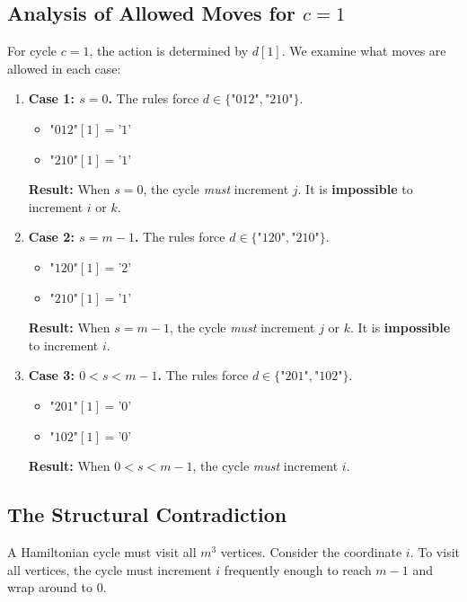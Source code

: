 \documentclass[12pt]{article}
\begin{document}
\subsection{Analysis of Allowed Moves for $c=1$}
For cycle $c=1$, the action is determined by $d[1]$. We examine what moves are allowed in each case:

\begin{enumerate}
    \item \textbf{Case 1: $s = 0$.}
    The rules force $d \in \{\text{"012"}, \text{"210"}\}$.
    \begin{itemize}
        \item $\text{"012"}[1] = \text{'1'}$
        \item $\text{"210"}[1] = \text{'1'}$
    \end{itemize}
    \textbf{Result:} When $s=0$, the cycle \textit{must} increment $j$. It is \textbf{impossible} to increment $i$ or $k$.
    
    \item \textbf{Case 2: $s = m-1$.}
    The rules force $d \in \{\text{"120"}, \text{"210"}\}$.
    \begin{itemize}
        \item $\text{"120"}[1] = \text{'2'}$
        \item $\text{"210"}[1] = \text{'1'}$
    \end{itemize}
    \textbf{Result:} When $s=m-1$, the cycle \textit{must} increment $j$ or $k$. It is \textbf{impossible} to increment $i$.
    
    \item \textbf{Case 3: $0 < s < m-1$.}
    The rules force $d \in \{\text{"201"}, \text{"102"}\}$.
    \begin{itemize}
        \item $\text{"201"}[1] = \text{'0'}$
        \item $\text{"102"}[1] = \text{'0'}$
    \end{itemize}
    \textbf{Result:} When $0 < s < m-1$, the cycle \textit{must} increment $i$.
\end{enumerate}

\subsection{The Structural Contradiction}
A Hamiltonian cycle must visit all $m^3$ vertices. Consider the coordinate $i$. To visit all vertices, the cycle must increment $i$ frequently enough to reach $m-1$ and wrap around to $0$.
\end{document}
